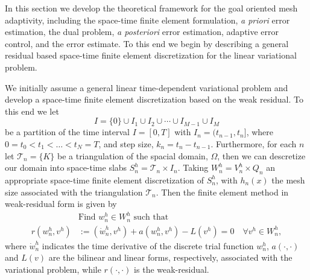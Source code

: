 In this section we develop the theoretical framework for the goal oriented mesh
adaptivity, including the space-time finite element formulation, \emph{a priori}
error estimation, the dual problem, \emph{a posteriori} error estimation,
adaptive error control, and the error estimate. To this end we begin by
describing a general residual based space-time finite element discretization for
the linear variational problem.

We initially assume a general linear time-dependent variational problem and
develop a space-time finite element discretization based on the weak residual.
To this end we let
\begin{equation*}
    I = \{0\} \cup I_1 \cup I_2 \cup \cdots \cup I_{M-1} \cup I_M
\end{equation*}
be a partition of the time interval $I = [0, T]$ with $I_n = (t_{n-1}, t_n]$,
where $0=t_0 < t_1 < \ldots < t_N = T$, and step size, $k_n = t_n - t_{n-1}$.
Furthermore, for each $n$ let $\mathcal{T}_n= \{K\}$ be a triangulation of the
spacial domain, $\Omega$, then we can descretize our domain into space-time
slabs $S^h_n = \mathcal{T}_n \times I_n$. Taking $W^h_n = V^h_n \times Q_n$ an
appropriate space-time finite element discretization of $S^h_n$, with $h_n(x)$
the mesh size associated with the triangulation $\mathcal{T}_n$. Then the finite
element method in weak-residual form is given by
\begin{equation}
    \begin{split}
        &\text{Find } w^h_n \in W^h_n \text{ such that} \\
        r(w^h_n, v^h) &:= (\dot{w}^h_n, v^h)
            + a(w^h_n, v^h) - L(v^h) = 0 \quad \forall v^h \in W^h_n,
    \end{split}
    \label{eq:WeakResidual}
\end{equation}
where $\dot{w}^h_n$ indicates the time derivative of the discrete
trial function $w^h_n$, $a(\cdot, \cdot)$ and $L(v)$ are the bilinear and linear
forms, respectively, associated with the variational problem, while $r(\cdot,
\cdot)$ is the weak-residual.

